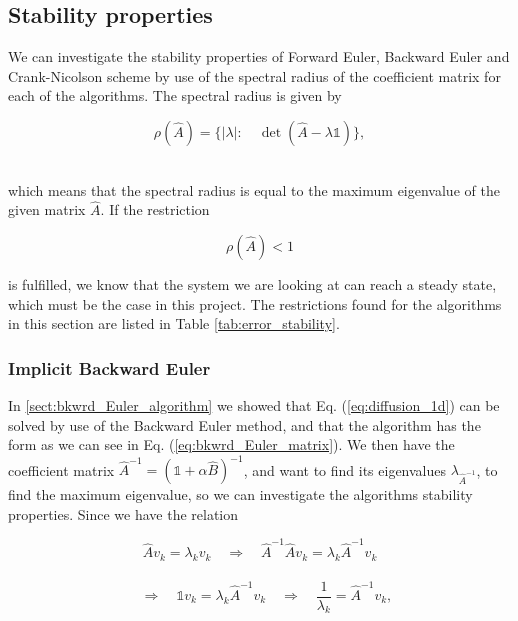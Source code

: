 \documentclass[12pt]{article}
\begin{document}
\begin{flushleft}
\subsection{Stability properties\label{sect:stability_properties}}
We can investigate the stability properties of Forward Euler, Backward Euler and Crank-Nicolson scheme by use of the spectral radius of the coefficient matrix for each of the algorithms. The spectral radius is given by

\vspace{5mm}
$$\rho(\hat{A}) = \{|\lambda|:\quad \det(\hat{A} - \lambda\mathbb{1})\},$$\\
\vspace{5mm}

which means that the spectral radius is equal to the maximum eigenvalue of the given matrix $\hat{A}$. If the restriction 

\begin{equation}\label{eq:restriction_spectral_radius}
\rho(\hat{A})<1
\end{equation}

is fulfilled, we know that the system we are looking at can reach a steady state, which must be the case in this project. The restrictions found for the algorithms in this section are listed in Table \ref{tab:error_stability}.

\subsubsection{Implicit Backward Euler\label{sect:eigvals_backwrd_Euler}}
In \ref{sect:bkwrd_Euler_algorithm} we showed that Eq. (\ref{eq:diffusion_1d}) can be solved by use of the Backward Euler method, and that the algorithm has the form as we can see in Eq. (\ref{eq:bkwrd_Euler_matrix}). We then have the coefficient matrix $\hat{A}^{-1} = (\mathbb{1} + \alpha\hat{B})^{-1}$, and want to find its eigenvalues $\lambda_{\hat{A}^{-1}}$, to find the maximum eigenvalue, so we can investigate the algorithms stability properties. Since we have the relation

\vspace{5mm}
$$\hat{A}v_k = \lambda_k v_k \quad\Rightarrow\quad \hat{A}^{-1}\hat{A}v_k = \lambda_k\hat{A}^{-1}v_k$$\\
$$\quad\Rightarrow\quad \mathbb{1}v_k = \lambda_k\hat{A}^{-1}v_k \quad\Rightarrow\quad \frac{1}{\lambda_k} = \hat{A}^{-1}v_k,$$\\
\vspace{5mm}


\end{flushleft}
\end{document}
